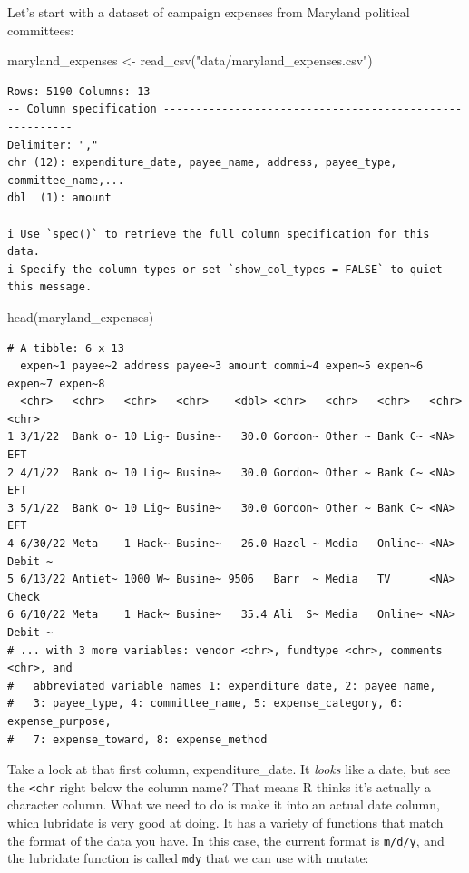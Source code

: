 \documentclass[
  letterpaper,
  DIV=11,
  numbers=noendperiod]{scrreprt}
\newenvironment{Shaded}{\begin{snugshade}}{\end{snugshade}}
\newcommand{\FunctionTok}[1]{\textcolor[rgb]{0.28,0.35,0.67}{#1}}
\newcommand{\NormalTok}[1]{\textcolor[rgb]{0.00,0.23,0.31}{#1}}
\newcommand{\OtherTok}[1]{\textcolor[rgb]{0.00,0.23,0.31}{#1}}
\newcommand{\StringTok}[1]{\textcolor[rgb]{0.13,0.47,0.30}{#1}}
\begin{document}
Let's start with a dataset of campaign expenses from Maryland political
committees:

\begin{Shaded}
\begin{Highlighting}[]
\NormalTok{maryland\_expenses }\OtherTok{\textless{}{-}} \FunctionTok{read\_csv}\NormalTok{(}\StringTok{"data/maryland\_expenses.csv"}\NormalTok{)}
\end{Highlighting}
\end{Shaded}

\begin{verbatim}
Rows: 5190 Columns: 13
-- Column specification --------------------------------------------------------
Delimiter: ","
chr (12): expenditure_date, payee_name, address, payee_type, committee_name,...
dbl  (1): amount

i Use `spec()` to retrieve the full column specification for this data.
i Specify the column types or set `show_col_types = FALSE` to quiet this message.
\end{verbatim}

\begin{Shaded}
\begin{Highlighting}[]
\FunctionTok{head}\NormalTok{(maryland\_expenses)}
\end{Highlighting}
\end{Shaded}

\begin{verbatim}
# A tibble: 6 x 13
  expen~1 payee~2 address payee~3 amount commi~4 expen~5 expen~6 expen~7 expen~8
  <chr>   <chr>   <chr>   <chr>    <dbl> <chr>   <chr>   <chr>   <chr>   <chr>  
1 3/1/22  Bank o~ 10 Lig~ Busine~   30.0 Gordon~ Other ~ Bank C~ <NA>    EFT    
2 4/1/22  Bank o~ 10 Lig~ Busine~   30.0 Gordon~ Other ~ Bank C~ <NA>    EFT    
3 5/1/22  Bank o~ 10 Lig~ Busine~   30.0 Gordon~ Other ~ Bank C~ <NA>    EFT    
4 6/30/22 Meta    1 Hack~ Busine~   26.0 Hazel ~ Media   Online~ <NA>    Debit ~
5 6/13/22 Antiet~ 1000 W~ Busine~ 9506   Barr  ~ Media   TV      <NA>    Check  
6 6/10/22 Meta    1 Hack~ Busine~   35.4 Ali  S~ Media   Online~ <NA>    Debit ~
# ... with 3 more variables: vendor <chr>, fundtype <chr>, comments <chr>, and
#   abbreviated variable names 1: expenditure_date, 2: payee_name,
#   3: payee_type, 4: committee_name, 5: expense_category, 6: expense_purpose,
#   7: expense_toward, 8: expense_method
\end{verbatim}

Take a look at that first column, expenditure\_date. It \emph{looks}
like a date, but see the \texttt{\textless{}chr} right below the column
name? That means R thinks it's actually a character column. What we need
to do is make it into an actual date column, which lubridate is very
good at doing. It has a variety of functions that match the format of
the data you have. In this case, the current format is \texttt{m/d/y},
and the lubridate function is called \texttt{mdy} that we can use with
mutate:
\end{document}
